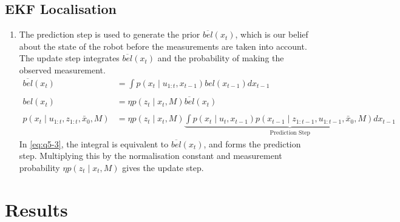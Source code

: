 \documentclass[a4paper,12pt]{article}
\newcommand{\eqname}[1]{\tag*{#1}} %
\begin{document}
\subsection{EKF Localisation}
\begin{enumerate}[resume]
\item The prediction step is used to generate the prior $\overline{bel}(x_t)$,
  which is our belief about the state of the robot before the measurements are
  taken into account. The update step integrates $\overline{bel}(x_t)$ and the
  probability of making the observed measurement.
  \begin{align}
    \overline{bel}(x_t)&=\int{p(x_t \mid
      u_{1:t},x_{t-1})bel(x_{t-1})dx_{t-1}}\\\eqname{Prediction step} \\
    bel(x_t)&=\eta p(z_t \mid x_t,M)\overline{bel}(x_t)\\\eqname{Update step}\\
    p(x_t\mid u_{1:t},z_{1:t},\bar{x}_0,M)&=\eta p(z_t \mid x_t,M)\underbrace{\int{p(x_t \mid
      u_t,x_{t-1})p(x_{t-1} \mid
      z_{1:t-1},u_{1:t-1},\bar{x}_0,M)dx_{t-1}}}_\text{Prediction Step}\label{eq:q5-3}
  \end{align}
  In \eqref{eq:q5-3}, the integral is equivalent to $\overline{bel}(x_t)$, and forms
  the prediction step. Multiplying this by the normalisation constant and
  measurement probability $\eta p(z_t \mid x_t,M)$ gives the update step.
\end{enumerate}
\section{Results}
\end{document}
